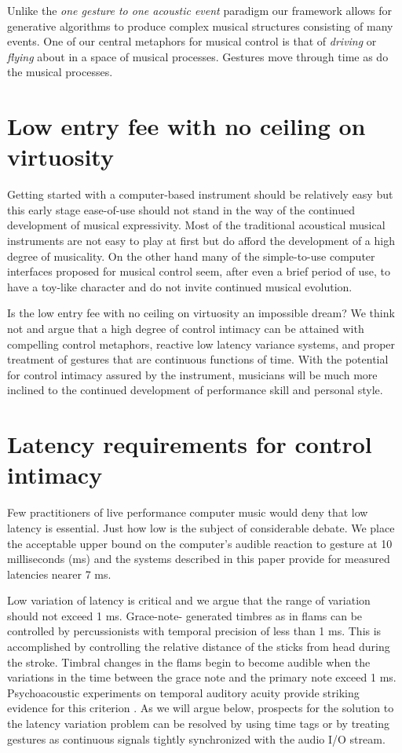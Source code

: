 Unlike the \textit{one gesture to one acoustic event} paradigm our framework allows for generative algorithms to produce complex musical structures consisting of many events. One of our central metaphors for musical control is that of \textit{driving} or \textit{flying} about in a space of musical processes. Gestures move through time as do the musical processes.

\section{Low entry fee with no ceiling on virtuosity}

Getting started with a computer-based instrument should be relatively easy but this early stage ease-of-use should not stand in the way of the continued development of musical expressivity. Most of the traditional acoustical musical instruments are not easy to play at first but do afford the development of a high degree of musicality. On the other hand many of the simple-to-use computer interfaces proposed for musical control seem, after even a brief period of use, to have a toy-like character and do not invite continued musical evolution.

Is the low entry fee with no ceiling on virtuosity an impossible dream? We think not and argue that a high degree of control intimacy can be attained with compelling control metaphors, reactive low latency variance systems, and proper treatment of gestures that are continuous functions of time. With the potential for control intimacy assured by the instrument, musicians will be much more inclined to the continued development of performance skill and personal style.

\section{Latency requirements for control intimacy}

Few practitioners of live performance computer music would deny that low latency is essential. Just how low is the subject of considerable debate. We place the acceptable upper bound on the computer's audible reaction to gesture at 10 milliseconds (ms) and the systems described in this paper provide for measured \cite{Freed:1997} latencies nearer 7 ms.

Low variation of latency is critical and we argue that the range of variation should not exceed 1 ms. Grace-note- generated timbres as in flams can be controlled by percussionists with temporal precision of less than 1 ms. This is accomplished by controlling the relative distance of the sticks from head during the stroke. Timbral changes in the flams begin to become audible when the variations in the time between the grace note and the primary note exceed 1 ms. Psychoacoustic experiments on temporal auditory acuity provide striking evidence for this criterion \cite{Henning:1981,Ronken:1970}. As we will argue below, prospects for the solution to the latency variation problem can be resolved by using time tags or by treating gestures as continuous signals tightly synchronized with the audio I/O stream.

